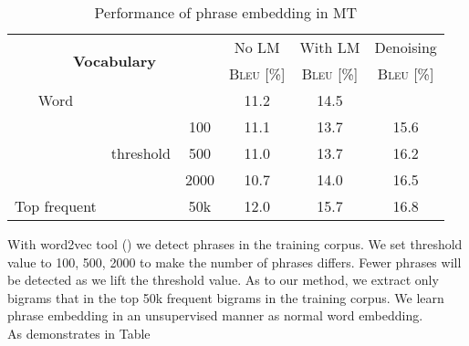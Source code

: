\begin{table}[h]
	\centering
	\begin{tabular}{ccccc  c}
		\hline
		\multicolumn{3}{c}{\multirow{2}{*}{\textbf{Vocabulary}}}                  & No LM & With LM & Denoising \\
		\multicolumn{3}{c}{}                                         &  \textsc{Bleu} [\%]  &  \textsc{Bleu} [\%] & \textsc{Bleu} [\%]   \\ \hline
		Word            & \multicolumn{2}{l}{}              & 11.2 & 14.5  &\leavevmode\color{blue}{ 17.2} \\
		\hline
		\multirow{3}{*}{\cite{mikolov2013distributed} } & \multirow{3}{*}{threshold} & 100  & 11.1 & 13.7  & 15.6 \\ \cline{3-6} 
		&                            & 500  & 11.0 & 13.7  & 16.2 \\ \cline{3-6} 
		&                            & 2000 & 10.7 & 14.0  &16.5 \\ \hline
		Top frequent              & \multicolumn{1}{l}{\text{count}}  & 50k  & \leavevmode\color{blue}12.0 & \leavevmode\color{blue}15.7  & 16.8 \\ \hline
	\end{tabular}
	\caption{Performance of phrase embedding in MT}
\end{table}
With word2vec tool (\cite{mikolov2013distributed}) we detect phrases in the training corpus. We set threshold value to 100, 500, 2000 to make the number of phrases differs. Fewer phrases will be detected as we lift the threshold value. As to our method, we extract only bigrams that in the top 50k frequent bigrams in the training corpus. We learn phrase embedding in an unsupervised manner as normal word embedding. \\
As demonstrates in Table


